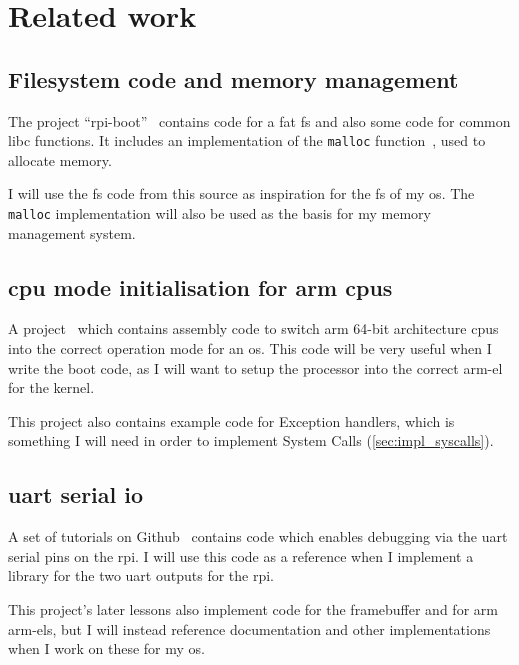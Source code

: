 \documentclass{article}
\begin{document}
\section{Related work}
\label{sec:related-works}
\begin{refsection}

\subsection{Filesystem code and memory management}
The project ``rpi-boot''~\cite{rpi-boot-gh} contains code for a \gls{fat}
\gls{fs} and also some code for common libc functions. It includes an
implementation of the \texttt{malloc} function~\cite{dlmalloc}, used to
allocate memory.

I will use the \gls{fs} code from this source as inspiration for the \gls{fs}
of my \gls{os}. The \texttt{malloc} implementation will also be used as the
basis for my memory management system.

\subsection{\texorpdfstring{\gls{cpu}}{CPU} mode initialisation for
\texorpdfstring{\gls{arm} \glspl{cpu}}{arm CPUs}}
A project~\cite{raspberry-pi-os-gh} which contains assembly code to switch
\gls{arm} 64-bit architecture \glspl{cpu} into the correct operation mode for
an \gls{os}. This code will be very useful when I write the boot code, as I
will want to setup the processor into the correct \gls{arm-el} for the kernel.

This project also contains example code for Exception handlers, which is
something I will need in order to implement System Calls
(\autoref{sec:impl_syscalls}).

\subsection{\texorpdfstring{\gls{uart}}{UART} serial
\texorpdfstring{\gls{io}}{IO}}
A set of tutorials on Github~\cite{raspi3-tutorial-gh} contains code which
enables debugging via the \gls{uart} serial pins on the \gls{rpi}. I will use
this code as a reference when I implement a library for the two \gls{uart}
outputs for the \gls{rpi}.

This project's later lessons also implement code for the framebuffer and for
\gls{arm} \glspl{arm-el}, but I will instead reference documentation and other
implementations when I work on these for my \gls{os}.


\end{refsection}
\end{document}
